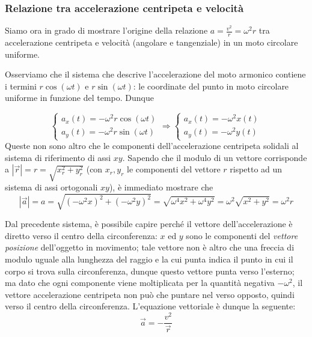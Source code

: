 \subsubsection*{Relazione tra accelerazione centripeta e velocità}
Siamo ora in grado di mostrare l'origine della relazione $a = \frac{v^2}{r} = \omega^2 r$
tra accelerazione centripeta e velocità (angolare e tangenziale) in un moto
circolare uniforme.

Osserviamo che il sistema che descrive l'accelerazione del moto armonico
contiene i termini $r\cos(\omega t)$ e $r\sin(\omega t)$: le coordinate del
punto in moto circolare uniforme in funzione del tempo. Dunque

\[
    \begin{cases}
        a_x(t) = -\omega^2 r\cos(\omega t)\\
        a_y(t) = -\omega^2 r\sin(\omega t)
    \end{cases}
    \Rightarrow
    \begin{cases}
        a_x(t) = -\omega^2 x(t)\\
        a_y(t) = -\omega^2 y(t)
    \end{cases}
\]
Queste non sono altro che le componenti dell'accelerazione centripeta
solidali al sistema di riferimento di assi $xy$. Sapendo che il modulo
di un vettore corrisponde a $|\overrightarrow{r}| = r = \sqrt{x_r^2 + y_r^2}$
(con $x_r,y_r$ le componenti del vettore $r$ rispetto ad un sistema di
assi ortogonali $xy$), è immediato mostrare che
\[ |\overrightarrow{a}| = a = \sqrt{(-\omega^2 x)^2 + (-\omega^2 y)^2} = \sqrt{\omega^4x^2 + \omega^4y^2} = \omega^2 \sqrt{x^2 + y^2} = \omega^2 r \]

Dal precedente sistema, è possibile capire perché il vettore dell'accelerazione
è diretto verso il centro della circonferenza: $x$ ed $y$ sono le componenti
del \textit{vettore posizione} dell'oggetto in movimento; tale vettore
non è altro che una freccia di modulo uguale alla lunghezza del raggio e la
cui punta indica il punto in cui il corpo si trova sulla circonferenza,
dunque questo vettore punta verso l'esterno; ma dato che ogni componente
viene moltiplicata per la quantità negativa $-\omega^2$, il vettore
accelerazione centripeta non può che puntare nel verso opposto, quindi
verso il centro della circonferenza. L'equazione vettoriale è dunque la
seguente:
\[ \overrightarrow{a} = -\frac{v^2}{\overrightarrow{r}} \]

